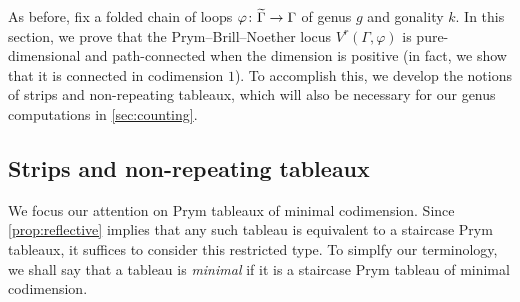 \documentclass[11pt,reqno]{amsart}
\newcommand*{\maps}{\nobreak\mskip2mu\mathpunct{}\nonscript
  \mkern-\thinmuskip{:}\mskip6muplus1mu\relax}
\newcommand*{\wti}[1]{\widetilde{#1}}
\newcommand{\yoav}[1]{{\color{blue} \sf  Yo$\alpha$v: [#1]}}
\newcommand{\caelan}[1]{\textcolor{orange}{\sf C: [#1]}}
\newcommand{\steven}[1]{\textcolor{pink}{\sf S: [#1]}}
\theoremstyle{definition}
\theoremstyle{problem}
\theoremstyle{plain}
\theoremstyle{remark}
\theoremstyle{theorem}
\numberwithin{equation}{section}
\numberwithin{figure}{section}
\theoremstyle{definition}
\theoremstyle{problem}
\theoremstyle{plain}
\begin{document}
As before, fix a folded chain of loops
$\varphi\maps\wti\Gamma\to\Gamma$ of genus $g$ and gonality $k$.  In
this section, we prove that the Prym--Brill--Noether locus
$V^r(\Gamma,\varphi)$ is pure-dimensional and path-connected when the
dimension is positive (in fact, we show that it is connected in codimension $1$).  To accomplish this, we develop the notions of strips and non-repeating
tableaux, which will also be necessary for our genus computations in
\cref{sec:counting}.

\subsection{Strips and non-repeating tableaux}\label{sec:an-interl}
%


We focus our attention on Prym tableaux of minimal codimension.  Since
\cref{prop:reflective} implies that any such tableau is equivalent to a
staircase Prym tableaux, it suffices to consider this restricted type.
To simplfy our terminology, we shall say that a tableau is
\textit{minimal} if it is a staircase Prym tableau of minimal
codimension.
\end{document}
